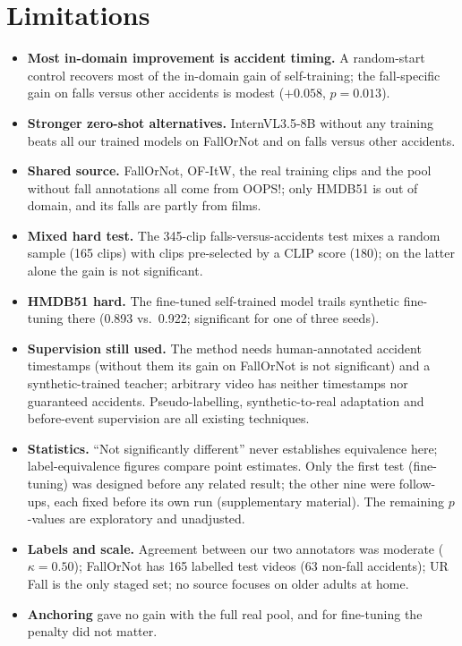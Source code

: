 \documentclass[10pt,twocolumn,letterpaper]{article}
\begin{document}
\section{Limitations}
\begin{itemize}\setlength\itemsep{1pt}
\item \textbf{Most in-domain improvement is accident timing.} A random-start control recovers most of the in-domain gain of self-training; the fall-specific gain on falls versus other accidents is modest ($+0.058$, $p=0.013$).
\item \textbf{Stronger zero-shot alternatives.} InternVL3.5-8B without any training beats all our trained models on FallOrNot and on falls versus other accidents.
\item \textbf{Shared source.} FallOrNot, OF-ItW, the real training clips and the pool without fall annotations all come from OOPS!; only HMDB51 is out of domain, and its falls are partly from films.
\item \textbf{Mixed hard test.} The 345-clip falls-versus-accidents test mixes a random sample (165 clips) with clips pre-selected by a CLIP score (180); on the latter alone the gain is not significant.
\item \textbf{HMDB51 hard.} The fine-tuned self-trained model trails synthetic fine-tuning there (0.893 vs.\ 0.922; significant for one of three seeds).
\item \textbf{Supervision still used.} The method needs human-annotated accident timestamps (without them its gain on FallOrNot is not significant) and a synthetic-trained teacher; arbitrary video has neither timestamps nor guaranteed accidents. Pseudo-labelling, synthetic-to-real adaptation and before-event supervision are all existing techniques.
\item \textbf{Statistics.} ``Not significantly different'' never establishes equivalence here; label-equivalence figures compare point estimates. Only the first test (fine-tuning) was designed before any related result; the other nine were follow-ups, each fixed before its own run (supplementary material). The remaining $p$-values are exploratory and unadjusted.
\item \textbf{Labels and scale.} Agreement between our two annotators was moderate ($\kappa=0.50$); FallOrNot has 165 labelled test videos (63 non-fall accidents); UR Fall is the only staged set; no source focuses on older adults at home.
\item \textbf{Anchoring} gave no gain with the full real pool, and for fine-tuning the penalty did not matter.
\end{itemize}
\end{document}
